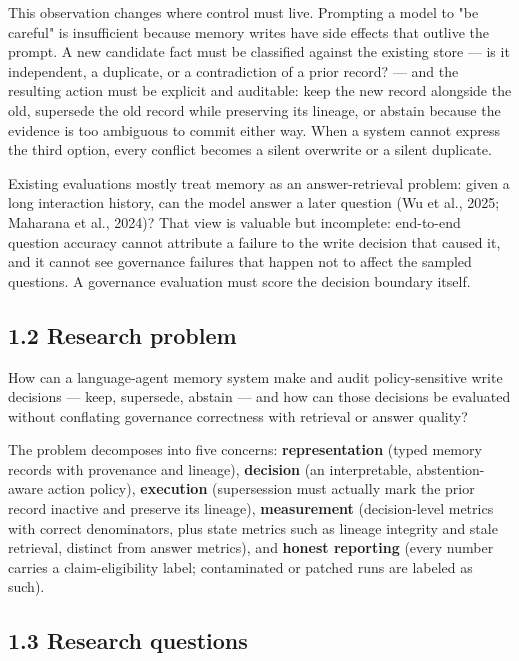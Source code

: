 This observation changes where control must live. Prompting a model to
"be careful" is insufficient because memory writes have side effects
that outlive the prompt. A new candidate fact must be classified against
the existing store --- is it independent, a duplicate, or a
contradiction of a prior record? --- and the resulting action must be
explicit and auditable: keep the new record alongside the old, supersede
the old record while preserving its lineage, or abstain because the
evidence is too ambiguous to commit either way. When a system cannot
express the third option, every conflict becomes a silent overwrite or a
silent duplicate.

Existing evaluations mostly treat memory as an answer-retrieval problem:
given a long interaction history, can the model answer a later question
(Wu et al., 2025; Maharana et al., 2024)? That view is valuable but
incomplete: end-to-end question accuracy cannot attribute a failure to
the write decision that caused it, and it cannot see governance failures
that happen not to affect the sampled questions. A governance evaluation
must score the decision boundary itself.

\subsection{1.2 Research problem}\label{research-problem}

How can a language-agent memory system make and audit policy-sensitive
write decisions --- keep, supersede, abstain --- and how can those
decisions be evaluated without conflating governance correctness with
retrieval or answer quality?

The problem decomposes into five concerns: \textbf{representation}
(typed memory records with provenance and lineage), \textbf{decision}
(an interpretable, abstention-aware action policy), \textbf{execution}
(supersession must actually mark the prior record inactive and preserve
its lineage), \textbf{measurement} (decision-level metrics with correct
denominators, plus state metrics such as lineage integrity and stale
retrieval, distinct from answer metrics), and \textbf{honest reporting}
(every number carries a claim-eligibility label; contaminated or patched
runs are labeled as such).

\subsection{1.3 Research questions}\label{research-questions}

